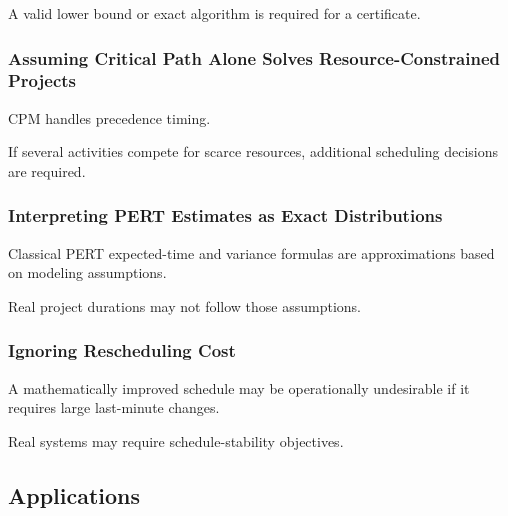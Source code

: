 A valid lower bound or exact algorithm is required for a certificate.

\subsubsection{Assuming Critical Path Alone Solves Resource-Constrained Projects}

CPM handles precedence timing.

If several activities compete for scarce resources, additional scheduling
decisions are required.

\subsubsection{Interpreting PERT Estimates as Exact Distributions}

Classical PERT expected-time and variance formulas are approximations based
on modeling assumptions.

Real project durations may not follow those assumptions.

\subsubsection{Ignoring Rescheduling Cost}

A mathematically improved schedule may be operationally undesirable if it
requires large last-minute changes.

Real systems may require schedule-stability objectives.

\subsection{Applications}
\label{subsec:scheduling-applications}

